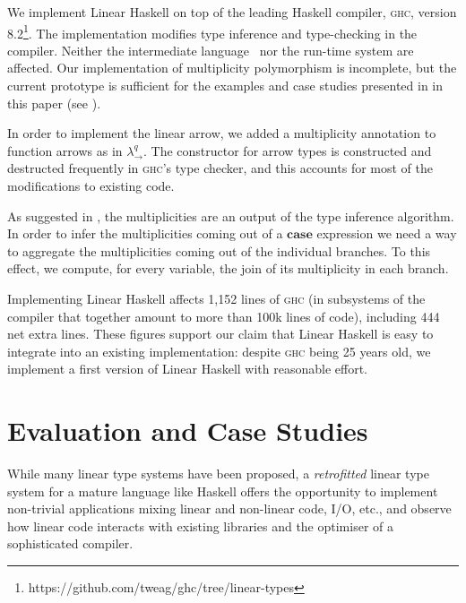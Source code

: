 \documentclass[acmsmall,screen]{acmart}\settopmatter{}
\newcommand\HaskeLL{Linear Haskell\xspace{}}
\newcommand\calc{{\ensuremath{λ^q_\to}}}
\begin{document}
We implement \HaskeLL{} on top of the leading Haskell compiler,
\textsc{ghc}, version 8.2\footnote{https://github.com/tweag/ghc/tree/linear-types}.
The implementation modifies type inference and
type-checking in the compiler. Neither the intermediate language~\cite{sulzmann_fc_2007}
nor the run-time system are affected.
%
Our implementation of multiplicity polymorphism is incomplete, but the current
prototype is sufficient for the examples and case studies presented in
in this paper (see ).

In order to implement the linear arrow, we added a multiplicity
annotation to function arrows as in \calc{}.
The constructor for arrow types is
constructed and destructed frequently in \textsc{ghc}'s type checker, and this
accounts for most of the modifications to existing code.

As suggested in , the multiplicities are an
output of the type inference algorithm. In order to infer the
multiplicities coming out of a \ensuremath{\mathbf{case}} expression we need a way to
aggregate the multiplicities coming out of the individual branches. To
this effect, we compute, for every variable, the join of its
multiplicity in each branch.

Implementing \HaskeLL{}
affects 1,152 lines of \textsc{ghc} (in subsystems of the compiler
that together amount to more than 100k lines of code), including 444
net extra lines. These figures support our claim that \HaskeLL{} is
easy to integrate into an existing implementation: despite
\textsc{ghc} being 25 years old, we implement a first version of
\HaskeLL{} with reasonable effort.

\section{Evaluation and Case Studies}
\label{sec:evaluation}
\label{sec:applications}

While many linear type systems have been proposed,
%
a {\em retrofitted} linear type system for a mature language like Haskell offers
the opportunity to implement non-trivial applications mixing linear and
non-linear code, I/O, etc., and observe how linear code interacts with existing
libraries and the optimiser of a sophisticated compiler.
\end{document}
